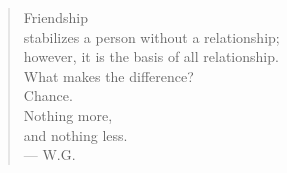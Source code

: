 \begin{quote}
Friendship \\
stabilizes a person without a relationship; \\
however, it is the basis of all relationship. \\
What makes the difference? \\
Chance. \\
Nothing more, \\
and nothing less. \\
--- W.G.
\end{quote}
